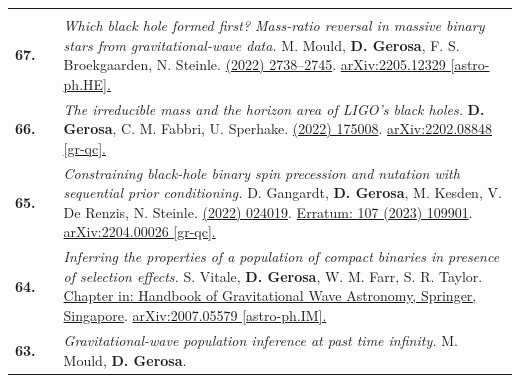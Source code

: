 {\begin{longtable}{rp{0.3cm}p{15.8cm}}
\vspace{0.09cm}\\
%
\textbf{67.} & & \textit{Which black hole formed first? Mass-ratio reversal in massive binary stars from gravitational-wave data.}
\newline{}
M. Mould, \textbf{D. Gerosa}, F. S. Broekgaarden, N. Steinle.
\newline{}
\href{https://doi.org/10.1093/mnras/stac2859}{\mnras 517 (2022) 2738–2745}. \href{https://arxiv.org/abs/2205.12329}{arXiv:2205.12329 [astro-ph.HE].}
\vspace{0.09cm}\\
%
\textbf{66.} & & \textit{The irreducible mass and the horizon area of LIGO's black holes.}
\newline{}
\textbf{D. Gerosa}, C. M. Fabbri, U. Sperhake.
\newline{}
\href{https://iopscience.iop.org/article/10.1088/1361-6382/ac8332}{\cqg 39 (2022) 175008}. \href{https://arxiv.org/abs/2202.08848}{arXiv:2202.08848 [gr-qc].}
\vspace{0.09cm}\\
%
\textbf{65.} & & \textit{Constraining black-hole binary spin precession and nutation with sequential prior conditioning.}
\newline{}
D. Gangardt, \textbf{D. Gerosa}, M. Kesden, V. De Renzis, N. Steinle.
\newline{}
\href{https://journals.aps.org/prd/abstract/10.1103/PhysRevD.106.024019}{\prd 106 (2022) 024019}. \href{https://journals.aps.org/prd/abstract/10.1103/PhysRevD.107.109901}{Erratum: 107 (2023) 109901}. \href{https://arxiv.org/abs/2204.00026}{arXiv:2204.00026 [gr-qc].}
\vspace{0.09cm}\\
%
\textbf{64.} & & \textit{Inferring the properties of a population of compact binaries in presence of selection effects.}
\newline{}
S. Vitale, \textbf{D. Gerosa}, W. M. Farr, S. R. Taylor.
\newline{}
\href{https://doi.org/10.1007/978-981-15-4702-7_45-1}{Chapter in: Handbook of Gravitational Wave Astronomy, Springer, Singapore}. \href{https://arxiv.org/abs/2007.05579}{arXiv:2007.05579 [astro-ph.IM].}
\vspace{0.09cm}\\
%
\textbf{63.} & & \textit{Gravitational-wave population inference at past time infinity.}
\newline{}
M. Mould, \textbf{D. Gerosa}.
\newline{}

\end{longtable}}

